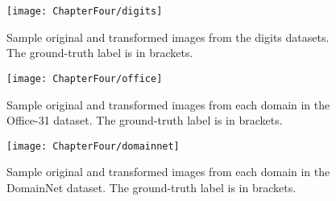 \begin{figure}[h!]
	\texttt{[image: ChapterFour/digits]}
	\caption{Sample original and transformed images from the digits datasets. The ground-truth label is in brackets.}
	\label{fig:digits_samples}
\end{figure}
\begin{figure}[h!]
	\texttt{[image: ChapterFour/office]}
	\caption{Sample original and transformed images from each domain in the Office-31 dataset. The ground-truth label is in brackets.}
	\label{fig:office_samples}
\end{figure}
\begin{figure}[h!]
	\texttt{[image: ChapterFour/domainnet]}
	\caption{Sample original and transformed images from each domain in the DomainNet dataset. The ground-truth label is in brackets.}
	\label{fig:domainnet_samples}
\end{figure}

